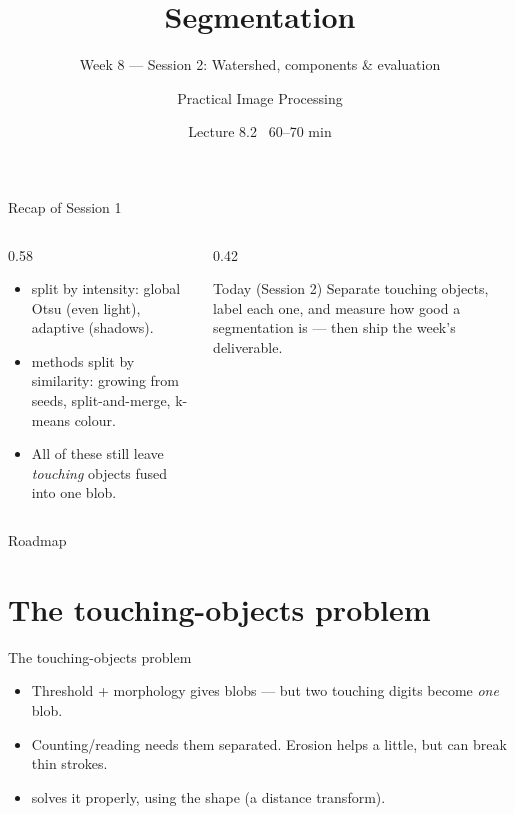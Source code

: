 \documentclass[10pt,aspectratio=169]{beamer}
\title{Segmentation}
\subtitle{Week 8 — Session 2: Watershed, components \& evaluation}
\author{Practical Image Processing}
\date{Lecture 8.2 \textbullet\ 60--70 min}
\begin{document}
\maketitle

\begin{frame}{Recap of Session 1}
  \begin{columns}[T]
    \begin{column}{0.58\textwidth}
      \begin{itemize}
        \item {} split by intensity: global Otsu (even light),
              adaptive (shadows).
        \item {} methods split by similarity: growing from seeds,
              split-and-merge, k-means colour.
        \item All of these still leave \emph{touching} objects fused into one blob.
      \end{itemize}
    \end{column}
    \begin{column}{0.42\textwidth}
      \begin{alertblock}{Today (Session 2)}
        Separate touching objects, label each one, and measure how good a segmentation
        is --- then ship the week's deliverable.
      \end{alertblock}
    \end{column}
  \end{columns}
\end{frame}

\begin{frame}{Roadmap}\tableofcontents\end{frame}

\section{The touching-objects problem}

\begin{frame}{The touching-objects problem}
  \begin{itemize}
    \item Threshold + morphology gives blobs --- but two touching digits become \emph{one} blob.
    \item Counting/reading needs them separated. Erosion helps a little, but can break thin strokes.
    \item {} solves it properly, using the shape (a distance transform).
  \end{itemize}
\end{frame}
\end{document}
